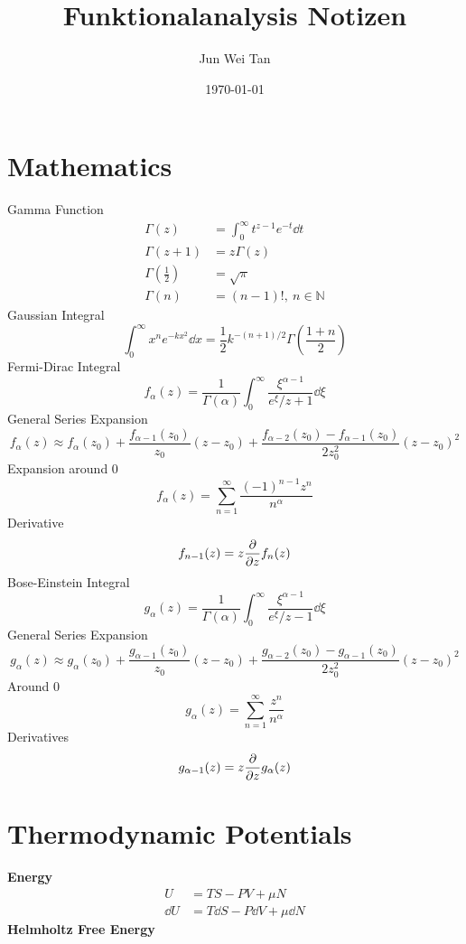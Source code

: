 \documentclass[prb,12pt]{revtex4-2}
\theoremstyle{definition}
\theoremstyle{definition}
\theoremstyle{definition}
\newcommand{\N}{\mathbb{N}}
\begin{document}
	\title{Funktionalanalysis Notizen}
	\author{Jun Wei Tan}
	\date{\today}
	\maketitle
	\section{Mathematics}
	Gamma Function
	\begin{align*}
		\Gamma(z)&=\int_0^\infty t^{z-1}e^{-t}\dd{t}\\
		\Gamma(z+1)&=z\Gamma(z)\\
		\Gamma\left(\frac 12\right)&=\sqrt{\pi}\\
		\Gamma(n)&=(n-1)!,~n\in \N
	\end{align*}
	Gaussian Integral
	\[\int_0^\infty x^n e^{-k x^2}\dd{x} = \frac 12 k^{-(n+1)/2}\Gamma\left(\frac{1+n}{2}\right)\]
	Fermi-Dirac Integral
	\[f_\alpha(z) =\frac 1{\Gamma(\alpha)}\int_0^\infty \frac{\xi^{\alpha-1}}{e^{\xi}/z + 1}\dd{\xi}\]
	General Series Expansion
	\[f_\alpha(z) \approx f_\alpha(z_0) + \frac{f_{\alpha - 1}(z_0)}{z_0}(z-z_0)+\frac{f_{\alpha -2}(z_0) - f_{\alpha - 1}(z_0)}{2z_0^2}(z-z_0)^2\]
	Expansion around 0
	\[f_\alpha(z) = \sum_{n=1}^\infty \frac{(-1)^{n-1}z^n}{n^\alpha}\]
	Derivative
	\[f_{n-1}(z) =z\pdv{z}f_n(z)\]
	Bose-Einstein Integral
	\[g_\alpha(z) = \frac{1}{\Gamma(\alpha)}\int_0^\infty \frac{\xi^{\alpha-1}}{e^\xi/z-1}\dd{\xi}\]
	General Series Expansion
	\[g_\alpha(z) \approx g_\alpha(z_0) + \frac{g_{\alpha - 1}(z_0)}{z_0}(z-z_0)+\frac{g_{\alpha -2}(z_0) - g_{\alpha - 1}(z_0)}{2z_0^2}(z-z_0)^2\]
	Around 0
	\[g_\alpha(z)=\sum_{n=1}^\infty\frac{z^n}{n^\alpha}\]
	Derivatives
	\[g_{\alpha - 1}(z) =z\pdv{z}g_\alpha(z)\]
\section{Thermodynamic Potentials}
\textbf{Energy}
\begin{align*}
	U&= TS - PV + \mu N\\
	\dd{U} &= T\dd{S}-P\dd{V}+\mu\dd{N}
\end{align*}
\textbf{Helmholtz Free Energy}
\end{document}
